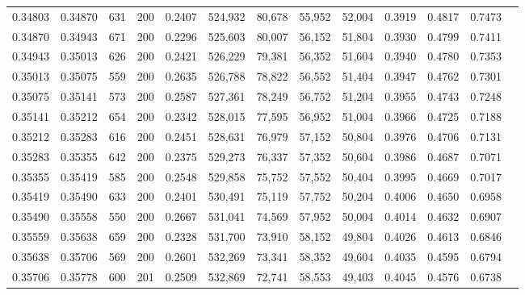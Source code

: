 \begin{tabular}{rrrrrrrrrrrrr}
0.34803 & 0.34870 &    631 & 200 &                                     0.2407 & 524,932 &  80,678 &  55,952 &  52,004 & 0.3919 & 0.4817 & 0.7473 \\
0.34870 & 0.34943 &    671 & 200 &                                     0.2296 & 525,603 &  80,007 &  56,152 &  51,804 & 0.3930 & 0.4799 & 0.7411 \\
0.34943 & 0.35013 &    626 & 200 &                                     0.2421 & 526,229 &  79,381 &  56,352 &  51,604 & 0.3940 & 0.4780 & 0.7353 \\
0.35013 & 0.35075 &    559 & 200 &                                     0.2635 & 526,788 &  78,822 &  56,552 &  51,404 & 0.3947 & 0.4762 & 0.7301 \\
0.35075 & 0.35141 &    573 & 200 &                                     0.2587 & 527,361 &  78,249 &  56,752 &  51,204 & 0.3955 & 0.4743 & 0.7248 \\
0.35141 & 0.35212 &    654 & 200 &                                     0.2342 & 528,015 &  77,595 &  56,952 &  51,004 & 0.3966 & 0.4725 & 0.7188 \\
0.35212 & 0.35283 &    616 & 200 &                                     0.2451 & 528,631 &  76,979 &  57,152 &  50,804 & 0.3976 & 0.4706 & 0.7131 \\
0.35283 & 0.35355 &    642 & 200 &                                     0.2375 & 529,273 &  76,337 &  57,352 &  50,604 & 0.3986 & 0.4687 & 0.7071 \\
0.35355 & 0.35419 &    585 & 200 &                                     0.2548 & 529,858 &  75,752 &  57,552 &  50,404 & 0.3995 & 0.4669 & 0.7017 \\
0.35419 & 0.35490 &    633 & 200 &                                     0.2401 & 530,491 &  75,119 &  57,752 &  50,204 & 0.4006 & 0.4650 & 0.6958 \\
0.35490 & 0.35558 &    550 & 200 &                                     0.2667 & 531,041 &  74,569 &  57,952 &  50,004 & 0.4014 & 0.4632 & 0.6907 \\
0.35559 & 0.35638 &    659 & 200 &                                     0.2328 & 531,700 &  73,910 &  58,152 &  49,804 & 0.4026 & 0.4613 & 0.6846 \\
0.35638 & 0.35706 &    569 & 200 &                                     0.2601 & 532,269 &  73,341 &  58,352 &  49,604 & 0.4035 & 0.4595 & 0.6794 \\
0.35706 & 0.35778 &    600 & 201 &                                     0.2509 & 532,869 &  72,741 &  58,553 &  49,403 & 0.4045 & 0.4576 & 0.6738 \\

\end{tabular}
